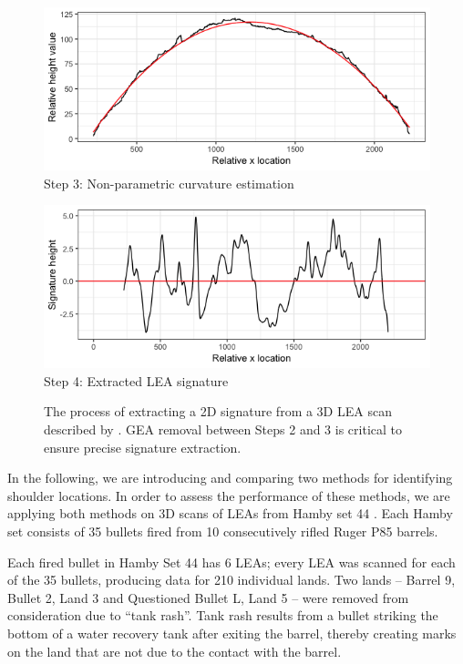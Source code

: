\documentclass[12pt]{article}
\begin{document}
\begin{figure}
\vspace{.3cm}
\begin{minipage}[b]{0.45\linewidth}
    \raggedleft
    \includegraphics[width=\textwidth]{images/profile_paper_loess}
    \centering
    Step 3: Non-parametric curvature estimation
\end{minipage}
\hspace{.5cm}
\begin{minipage}[b]{0.45\linewidth}
    \raggedright
    \includegraphics[width=\textwidth]{images/signature_paper}
    \centering
    Step 4: Extracted LEA signature
\end{minipage}
\caption{The process of extracting a 2D signature from a 3D LEA scan described by \cite{Hare1}. GEA removal between Steps 2 and 3 is critical to ensure precise signature extraction.}  
\label{fig:process}
\end{figure}

In the following, we are introducing and comparing two methods for
identifying shoulder locations. In order to assess the performance of
these methods, we are applying both methods on 3D scans of LEAs from
Hamby set 44 \citep{Hamby}. Each Hamby set consists of 35 bullets fired
from 10 consecutively rifled Ruger P85 barrels.

Each fired bullet in Hamby Set 44 has 6 LEAs; every LEA was scanned for
each of the 35 bullets, producing data for 210 individual lands. Two
lands -- Barrel 9, Bullet 2, Land 3 and Questioned Bullet L, Land 5 --
were removed from consideration due to ``tank rash''. Tank rash results
from a bullet striking the bottom of a water recovery tank after exiting
the barrel, thereby creating marks on the land that are not due to the
contact with the barrel.
\end{document}
